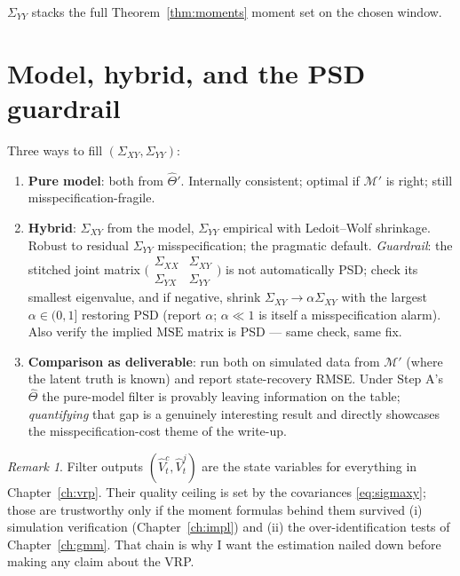 \documentclass[11pt]{report}
\theoremstyle{definition}
\theoremstyle{remark}
\newtheorem{impact}[theorem]{Remark}
\newcommand{\Vc}{V^{c}}
\newcommand{\Vj}{V^{j}}
\begin{document}
$\Sigma_{YY}$ stacks the full Theorem~\ref{thm:moments} moment set on the
chosen window.

\section{Model, hybrid, and the PSD guardrail}

Three ways to fill $(\Sigma_{XY},\Sigma_{YY})$:
\begin{enumerate}
\item \textbf{Pure model}: both from $\hat\Theta'$. Internally consistent;
optimal if $\mathcal{M}'$ is right; still misspecification-fragile.
\item \textbf{Hybrid}: $\Sigma_{XY}$ from the model, $\Sigma_{YY}$
empirical with Ledoit--Wolf shrinkage. Robust to residual $\Sigma_{YY}$
misspecification; the pragmatic default. \emph{Guardrail}: the stitched
joint matrix
$\bigl(\begin{smallmatrix}\Sigma_{XX}&\Sigma_{XY}\\ \Sigma_{YX}&\Sigma_{YY}\end{smallmatrix}\bigr)$
is not automatically PSD; check its smallest eigenvalue, and if negative,
shrink $\Sigma_{XY}\to\alpha\Sigma_{XY}$ with the largest
$\alpha\in(0,1]$ restoring PSD (report $\alpha$; $\alpha\ll1$ is itself a
misspecification alarm). Also verify the implied
$\text{MSE}$ matrix is PSD --- same check, same fix.
\item \textbf{Comparison as deliverable}: run both on simulated data from
$\mathcal{M}'$ (where the latent truth is known) and report state-recovery
RMSE. Under Step A's $\hat\Theta$ the pure-model filter is provably leaving
information on the table; \emph{quantifying} that gap is a genuinely
interesting result and directly showcases the misspecification-cost theme
of the write-up.
\end{enumerate}

\begin{impact}
Filter outputs $(\hat\Vc_{t},\hat\Vj_{t})$ are the state variables for
everything in Chapter~\ref{ch:vrp}. Their quality ceiling is set by the
covariances \eqref{eq:sigmaxy}; those are trustworthy only if the moment
formulas behind them survived (i) simulation verification
(Chapter~\ref{ch:impl}) and (ii) the over-identification tests of
Chapter~\ref{ch:gmm}. That chain is why I want the estimation nailed down before making any claim
about the VRP.
\end{impact}

\end{document}
